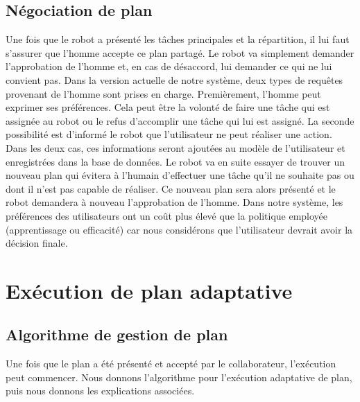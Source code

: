\documentclass[a4paper,11pt,twoside]{StyleThese}
\begin{document}
\subsection{Négociation de plan}
Une fois que le robot a présenté les tâches principales et la répartition, il lui faut s'assurer que l'homme accepte ce plan partagé. Le robot va simplement demander l'approbation de l'homme et, en cas de désaccord, lui demander ce qui ne lui convient pas.
Dans la version actuelle de notre système, deux types de requêtes provenant de l'homme sont prises en charge. Premièrement, l'homme peut exprimer ses préférences. Cela peut être la volonté de faire une tâche qui est assignée au robot ou le refus d'accomplir une tâche qui lui est assigné. La seconde possibilité est d'informé le robot que l'utilisateur ne peut réaliser une action. Dans les deux cas, ces informations seront ajoutées au modèle de l'utilisateur et enregistrées dans la base de données. Le robot va en suite essayer de trouver un nouveau plan qui évitera à l'humain d'effectuer une tâche qu'il ne souhaite pas ou dont il n'est pas capable de réaliser. Ce nouveau plan sera alors présenté et le robot demandera à nouveau l'approbation de l'homme. Dans notre système, les préférences des utilisateurs ont un coût plus élevé que la politique employée (apprentissage ou efficacité) car nous considérons que l'utilisateur devrait avoir la décision finale.


\section{Exécution de plan adaptative}
\label{planExecution}

\subsection{Algorithme de gestion de plan}
\label{sec:algo}
Une fois que le plan a été présenté et accepté par le collaborateur, l'exécution peut commencer. Nous donnons l'algorithme pour l'exécution adaptative de plan, puis nous donnons les explications associées.
\end{document}
